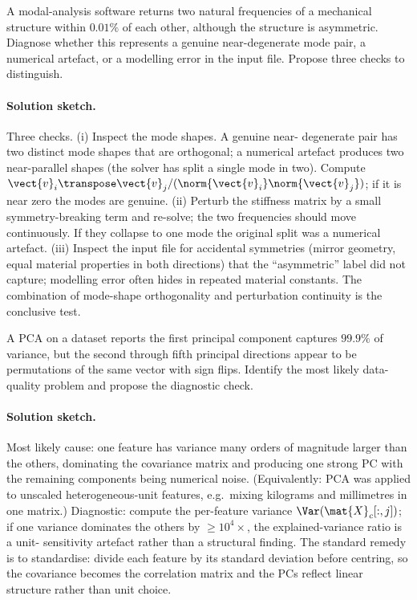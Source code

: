 \begin{exercise}
A modal-analysis software returns two natural frequencies of a
mechanical structure within $0.01\%$ of each other, although the
structure is asymmetric. Diagnose whether this represents a
genuine near-degenerate mode pair, a numerical artefact, or a
modelling error in the input file. Propose three checks to
distinguish.
\end{exercise}

\paragraph{Solution sketch.}
Three checks. (i) Inspect the mode shapes. A genuine near-
degenerate pair has two distinct mode shapes that are orthogonal;
a numerical artefact produces two near-parallel shapes (the solver
has split a single mode in two). Compute
$\vect{v}_{i}\transpose \vect{v}_{j}/(\norm{\vect{v}_{i}}
\norm{\vect{v}_{j}})$; if it is near zero the modes are genuine. (ii)
Perturb the stiffness matrix by a small symmetry-breaking term and
re-solve; the two frequencies should move continuously. If they
collapse to one mode the original split was a numerical artefact.
(iii) Inspect the input file for accidental symmetries (mirror
geometry, equal material properties in both directions) that the
``asymmetric'' label did not capture; modelling error often hides
in repeated material constants. The combination of mode-shape
orthogonality and perturbation continuity is the conclusive test.

\begin{exercise}
A PCA on a dataset reports the first principal component captures
$99.9\%$ of variance, but the second through fifth principal
directions appear to be permutations of the same vector with sign
flips. Identify the most likely data-quality problem and propose
the diagnostic check.
\end{exercise}

\paragraph{Solution sketch.}
Most likely cause: one feature has variance many orders of
magnitude larger than the others, dominating the covariance matrix
and producing one strong PC with the remaining components being
numerical noise. (Equivalently: PCA was applied to unscaled
heterogeneous-unit features, e.g.\ mixing kilograms and millimetres
in one matrix.) Diagnostic: compute the per-feature variance
$\Var(\mat{X}_{c}[:, j])$; if one variance dominates the others by
$\geq 10^{4}\times$, the explained-variance ratio is a unit-
sensitivity artefact rather than a structural finding. The standard
remedy is to standardise: divide each feature by its standard
deviation before centring, so the covariance becomes the correlation
matrix and the PCs reflect linear structure rather than unit choice.


